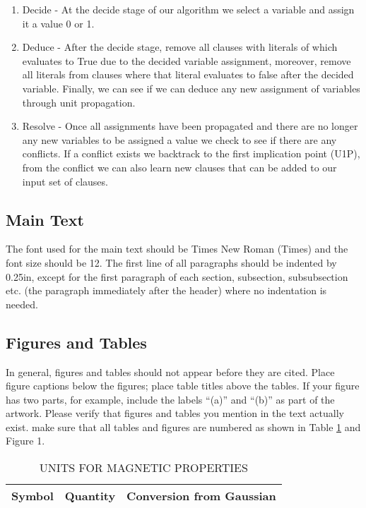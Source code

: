 \documentclass[12pt,a4paper]{article}
\begin{document}
\begin{enumerate}
	\item{Decide - At the decide stage of our algorithm we select a variable and assign it a value 0 or 1.}
	\item{Deduce - After the decide stage, remove all clauses with literals of which evaluates to True due to the decided variable assignment, moreover, remove all literals from clauses where that literal evaluates to false after the decided variable. Finally, we can see if we can deduce any new assignment of variables through unit propagation.}
	\item{Resolve - Once all assignments have been propagated and there are no longer any new variables to be assigned a value we check to see if there are any conflicts. If a conflict exists we backtrack to the first implication point (U1P), from the conflict we can also learn new clauses that can be added to our input set of clauses.}
\end{enumerate}
\subsection{Main Text}

The font used for the main text should be Times New Roman (Times) and the font size should be 12.  The first line of all paragraphs should be indented by 0.25in, except for the first paragraph of each section, subsection, subsubsection etc. (the paragraph immediately after the header) where no indentation is needed.

\subsection{Figures and Tables}
In general, figures and tables should not appear before they are cited.  Place figure captions below the figures; place table titles above the tables.  If your figure has two parts, for example, include the labels ``(a)'' and ``(b)'' as part of the artwork.  Please verify that figures and tables you mention in the text actually exist.  make sure that all tables and figures are numbered as shown in Table \ref{units} and Figure 1.

\begin{table}[htb]
\centering
\caption{UNITS FOR MAGNETIC PROPERTIES}
\vspace*{6pt}
\label{units}
\begin{tabular}{ccc}\hline\hline
Symbol & Quantity & Conversion from Gaussian \\ \hline
\end{tabular}
\end{table}
\end{document}
